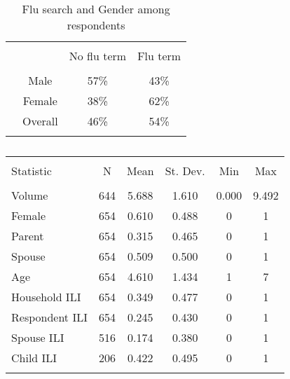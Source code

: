 \documentclass[12pt]{article}
\begin{document}
\begin{table}[!htbp] \centering 
  \caption{Flu search and Gender among respondents} 
  \label{descript2b} 
\begin{tabular}{@{\extracolsep{5pt}} lccc} 
\\[-1.8ex]\hline 
\hline \\[-1.8ex] 
 &  & No flu term & Flu term \\ 
\hline \\[-1.8ex] 
 & Male      & 57\% & 43\% \\ 
 & Female    & 38\% & 62\% \\ 
 & Overall   & 46\% & 54\% \\ 
\hline \\[-1.8ex] 
\end{tabular} 
\end{table} 

\begin{table}[!htbp] \centering 
  \caption{} 
  \label{tab: Descriptives} 
\begin{tabular}{@{\extracolsep{5pt}}lccccc} 
\\[-1.8ex]\hline 
\hline \\[-1.8ex] 
Statistic & \multicolumn{1}{c}{N} & \multicolumn{1}{c}{Mean} & \multicolumn{1}{c}{St. Dev.} & \multicolumn{1}{c}{Min} & \multicolumn{1}{c}{Max} \\ 
\hline \\[-1.8ex] 
Volume & 644 & 5.688 & 1.610 & 0.000 & 9.492 \\ 
Female & 654 & 0.610 & 0.488 & 0 & 1 \\ 
Parent & 654 & 0.315 & 0.465 & 0 & 1 \\ 
Spouse & 654 & 0.509 & 0.500 & 0 & 1 \\ 
Age & 654 & 4.610 & 1.434 & 1 & 7 \\ 
Household ILI & 654 & 0.349 & 0.477 & 0 & 1 \\ 
Respondent ILI & 654 & 0.245 & 0.430 & 0 & 1 \\ 
Spouse ILI & 516 & 0.174 & 0.380 & 0 & 1 \\ 
Child ILI & 206 & 0.422 & 0.495 & 0 & 1 \\ 
\hline \\[-1.8ex] 
\end{tabular} 
\end{table} 
\end{document}
